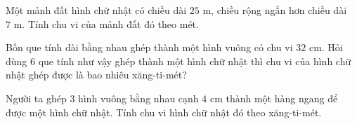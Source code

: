 \begin{ex} %
Một mảnh đất hình chữ nhật có chiều dài $25\text{ m}$, chiều rộng ngắn hơn chiều dài $7\text{ m}$. Tính chu vi của mảnh đất đó theo mét.
\end{ex}

\begin{ex} %
Bốn que tính dài bằng nhau ghép thành một hình vuông có chu vi $32\text{ cm}$. Hỏi dùng 6 que tính như vậy ghép thành một hình chữ nhật thì chu vi của hình chữ nhật ghép được là bao nhiêu xăng-ti-mét?
\end{ex}

\begin{ex} %
Người ta ghép 3 hình vuông bằng nhau cạnh $4\text{ cm}$ thành một hàng ngang để được một hình chữ nhật. Tính chu vi hình chữ nhật đó theo xăng-ti-mét.
\end{ex}

